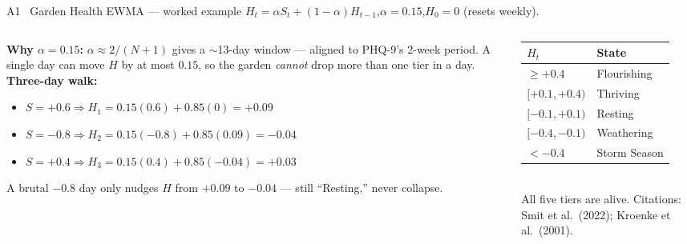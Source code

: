 \documentclass[aspectratio=169,11pt]{beamer}
\begin{document}
\begin{frame}{A1 \textperiodcentered\ Garden Health EWMA --- worked example}
{\footnotesize $H_t = \alpha S_t + (1-\alpha)H_{t-1}$,\quad $\alpha = 0.15$,\quad $H_0 = 0$ (resets weekly).}
\vspace{0.3em}
\begin{columns}[T,onlytextwidth]
  \begin{column}{0.52\textwidth}
    {\footnotesize\textbf{Why $\alpha=0.15$:} $\alpha \approx 2/(N{+}1)$ gives a $\sim$13-day window --- aligned to PHQ-9's 2-week period. A single day can move $H$ by at most $0.15$, so the garden \emph{cannot} drop more than one tier in a day.}
    \vspace{0.5em}
    {\footnotesize\textbf{Three-day walk:}}
    \begin{itemize}\footnotesize
      \item $S=+0.6 \Rightarrow H_1 = 0.15(0.6)+0.85(0) = +0.09$
      \item $S=-0.8 \Rightarrow H_2 = 0.15(-0.8)+0.85(0.09) = -0.04$
      \item $S=+0.4 \Rightarrow H_3 = 0.15(0.4)+0.85(-0.04) = +0.03$
    \end{itemize}
    {\footnotesize A brutal $-0.8$ day only nudges $H$ from $+0.09$ to $-0.04$ --- still ``Resting,'' never collapse.}
  \end{column}
  \begin{column}{0.44\textwidth}
  {\scriptsize
  \begin{tabular}{@{}ll@{}}
  \toprule
  $H_t$ & State \\
  \midrule
  $\geq +0.4$ & Flourishing \\
  $[+0.1,+0.4)$ & Thriving \\
  $[-0.1,+0.1)$ & Resting \\
  $[-0.4,-0.1)$ & Weathering \\
  $< -0.4$ & Storm Season \\
  \bottomrule
  \end{tabular}}
  \\[0.4em]{\scriptsize All five tiers are alive. Citations: Smit et al.\ (2022); Kroenke et al.\ (2001).}
  \end{column}
\end{columns}
\end{frame}
\end{document}
